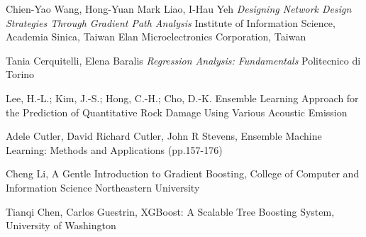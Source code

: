 \documentclass[12pt,a4paper,openright,twoside]{report}
\begin{document}
\begin{thebibliography}{90}
Chien-Yao Wang, Hong-Yuan Mark Liao, I-Hau Yeh \emph{Designing Network Design Strategies Through Gradient Path Analysis}
Institute of Information Science, Academia Sinica, Taiwan Elan Microelectronics Corporation, Taiwan

 Tania Cerquitelli, Elena Baralis
\emph{Regression Analysis: Fundamentals}
Politecnico di Torino

 Lee, H.-L.; Kim, J.-S.; Hong,
C.-H.; Cho, D.-K. Ensemble Learning
Approach for the Prediction of
Quantitative Rock Damage Using
Various Acoustic Emission

 Adele Cutler, David Richard Cutler, John R Stevens,
Ensemble Machine Learning: Methods and Applications (pp.157-176)

 Cheng Li,
A Gentle Introduction to Gradient Boosting,
College of Computer and Information Science
Northeastern University

Tianqi Chen, Carlos Guestrin, 
XGBoost: A Scalable Tree Boosting System, 
University of Washington

\end{thebibliography}
\end{document}
